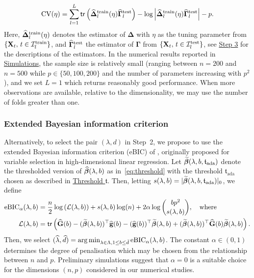 \begin{align*}
\text{CV}(\eta) = \sum_{l = 1}^L \mathsf{tr}\left( \widehat{\bm\Delta}_l^{\text{train}}(\eta) \widehat{\bm\Gamma}_l^{\text{test}} \right) - \log \left\vert \widehat{\bm\Delta}_l^{\text{train}}(\eta) \widehat{\bm\Gamma}_l^{\text{test}} \right\vert - p.
\end{align*}
Here, $\widehat{\bm\Delta}_l^{\text{train}}(\eta)$ denotes the estimator of $\bm\Delta$ with $\eta$ as the tuning parameter from $\{\mathbf X_t, \, t \in \mathcal I^{\text{train}}_l\}$, and $\widehat{\bm\Gamma}_l^{\text{test}}$ the estimator of $\bm\Gamma$ from $\{\mathbf X_t, \, t \in \mathcal I^{\text{test}}_l\}$, see \hyperref[sec:step:three]{Step 3} for the descriptions of the estimators.
In the numerical results reported in \hyperref[sec:sim]{Simulations}, the sample size is relatively small (ranging between $n = 200$ and $n = 500$ while $p \in \{50, 100, 200\}$ and the number of parameters increasing with $p^2$), and we set $L = 1$ which returns reasonably good performance.
When more observations are available, relative to the dimensionality, we may use the number of folds greater than one. 

\subsubsection{Extended Bayesian information criterion}
\label{sec:tuning:ebic}

Alternatively, to select the pair $(\lambda, d)$ in Step~2, we propose to use the extended Bayesian information criterion (eBIC) of \cite{chen2008extended}, originally proposed for variable selection in high-dimensional linear regression.
Let $\widetilde{\bm\beta}(\lambda, b, \mathfrak{t}_{\text{ada}})$ denote the thresholded version of $\widehat{\bm\beta}(\lambda, b)$ as in~\eqref{eq:threshold} with the threshold $\mathfrak{t}_{\text{ada}}$ chosen as described in \hyperref[sec:tuning:thresh]{Threshold $\mathfrak{t}$}.
Then, letting $s(\lambda, b) = \vert \widetilde{\bm\beta}(\lambda, b, \mathfrak{t}_{\text{ada}}) \vert_0$, we define
\begin{align}
\label{eq:ebic}
\text{eBIC}_{\alpha} (\lambda, b) &= \frac{n}{2} \log \left( \mathcal L(\lambda, b) \right) +  s(\lambda, b) \log(n) + 2 \alpha  \log{ bp^2 \choose s(\lambda, b)}, \quad \text{where}
\\
\mathcal{L}(\lambda, b) &= \mathsf{tr}\left( \widehat{\mathbf G}(b) - (\widetilde{\bm\beta}(\lambda, b))^\top \widehat{\mathbf g}(b) - (\widehat{\mathbf g}(b))^\top \widetilde{\bm\beta}(\lambda, b) + (\widetilde{\bm\beta}(\lambda, b))^\top \widehat{\mathbf G}(b) \widetilde{\bm\beta}(\lambda, b) \right).
	\nonumber
\end{align}
Then, we select $(\widehat\lambda, \widehat d) = \arg\min_{\lambda \in \Lambda, 1 \le b \le \bar{d}} \text{eBIC}_{\alpha} (\lambda, b)$.
The constant $\alpha \in (0, 1)$ determines the degree of penalisation which may be chosen from the relationship between $n$ and $p$.
Preliminary simulations suggest that $\alpha = 0$ is a suitable choice for the dimensions $(n, p)$ considered in our numerical studies. 

